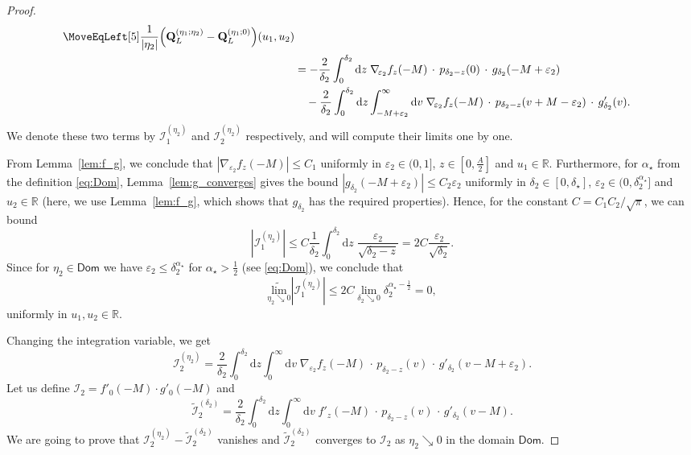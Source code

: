 \documentclass[oneside,final,11pt]{amsart}
\theoremstyle{definition}
\renewcommand{\d}{\mathrm{d}}
\newcommand{\Dom}{\mathsf{Dom}}
\newcommand{\mylim}[1]{\underset{#1}{\wt{\mathrm{lim}}}}
\newcommand{\R}{\mathbb{R}}
\newcommand{\1}[1]{\mathbf{1}_{#1}}
\newcommand{\eps}{\varepsilon}
\newcommand{\wt}{\widetilde}
\newcommand{\fQ}{\mathbf{Q}}
\newcommand{\CI}{\mathcal{I}}
\numberwithin{equation}{section}
\begin{document}
\begin{proof}
\begin{equation}
\begin{split}
\MoveEqLeft[5]
	\frac{1}{|\eta_2|} \Bigl(\fQ_L^{(\eta_1; \eta_2)} - \fQ_L^{(\eta_1; 0)}\Bigr)(u_1, u_2)\\
	&= - \frac{2}{\delta_2} \int_{0}^{\delta_2} \d z\; \nabla_{\!\eps_2} f_z(-M) \,\cdot\, p_{\delta_2 - z}(0) \,\cdot\, g_{\delta_2}(-M + \eps_2)\\
	&\quad- \frac{2}{\delta_2} \int_{0}^{\delta_2} \d z \int_{-M + \eps_2}^{\infty} \d v\; \nabla_{\!\eps_2} f_z(-M) \,\cdot\, p_{\delta_2 - z}(v + M - \eps_2) \,\cdot\, g'_{\delta_2}(v).
\end{split}
\label{eq:Q_formula2}
\end{equation}
We denote these two terms by $\CI^{(\eta_2)}_1$ and $\CI^{(\eta_2)}_2$ respectively, and will compute their limits one by one.

\smallskip
\noindent {\bf The term $\CI^{(\eta_2)}_1$.} From Lemma~\ref{lem:f_g}, we conclude that $|\nabla_{\!\eps_2} f_z(-M)| \leq C_1$ uniformly in $\eps_2 \in (0,1]$, $z \in [0, \frac{A}{2}]$ and $u_1 \in \R$. Furthermore, for $\alpha_\star$ from the definition \eqref{eq:Dom}, Lemma~\ref{lem:g_converges} gives the bound $|g_{\delta_2}(-M + \eps_2)| \leq C_2 \eps_2$ uniformly in $\delta_2 \in [0, \delta_\star]$, $\eps_2 \in (0,\delta_2^{\alpha_\star}]$ and $u_2 \in \R$ (here, we use Lemma~\ref{lem:f_g}, which shows that $g_{\delta_2}$ has the required properties). Hence, for the constant $C = C_1 C_2 / \sqrt{\pi}$, we can bound
\begin{equation}
	|\CI^{(\eta_2)}_1| \leq C \frac{1}{\delta_2} \int_{0}^{\delta_2} \d z\; \frac{\eps_2}{\sqrt{\delta_2 - z}} = 2 C \frac{\eps_2}{\sqrt{\delta_2}}.
\end{equation}
Since for $\eta_2 \in \Dom$ we have $\eps_2 \leq \delta_2^{\alpha_\star}$ for $\alpha_\star > \frac{1}{2}$ (see \eqref{eq:Dom}), we conclude that
\begin{equation}\label{eq:I1_limit}
	\mylim{\eta_2 \searrow 0} |\CI^{(\eta_2)}_1| \leq 2 C \lim_{\delta_2 \searrow 0} \delta_2^{\alpha_\star - \frac{1}{2}} = 0,
\end{equation}
uniformly in $u_1, u_2 \in \R$.

\smallskip
\noindent {\bf The term $\CI^{(\eta_2)}_2$.} Changing the integration variable, we get
\begin{equation}
	\CI^{(\eta_2)}_2 = \frac{2}{\delta_2} \int_{0}^{\delta_2} \d z \int_{0}^{\infty} \d v\; \nabla_{\!\eps_2} f_z(-M) \,\cdot\, p_{\delta_2 - z}(v) \,\cdot\, g'_{\delta_2}(v - M + \eps_2).
\end{equation}
Let us define $\CI_2 = f'_0(-M) \cdot g'_{0}(-M)$ and
\begin{equation}\label{eq:I2_tilde}
	\wt{\CI}^{(\delta_2)}_2 = \frac{2}{\delta_2} \int_{0}^{\delta_2} \d z \int_{0}^{\infty} \d v\; f'_z(-M) \,\cdot\, p_{\delta_2 - z}(v) \,\cdot\, g'_{\delta_2}(v - M).
\end{equation}
We are going to prove that $\CI^{(\eta_2)}_2 - \wt{\CI}^{(\delta_2)}_2$ vanishes and $\wt{\CI}^{(\delta_2)}_2$ converges to $\CI_2$ as $\eta_2 \searrow 0$ in the domain $\Dom$.


\end{proof}
\end{document}
